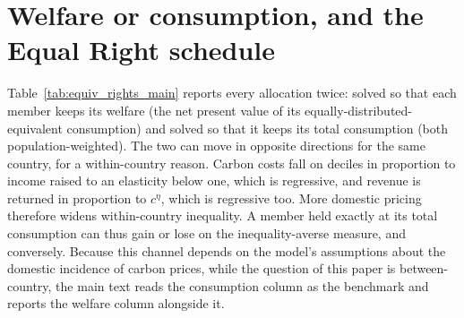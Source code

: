 \documentclass[12pt,english]{article}
\theoremstyle{remark}
\begin{document}



\section{Welfare or consumption, and the Equal Right schedule}
\label{app:ede}

Table~\ref{tab:equiv_rights_main} reports every allocation twice: solved so that each member keeps its welfare (the net present value of its equally-distributed-equivalent consumption) and solved so that it keeps its total consumption (both population-weighted). The two can move in opposite directions for the same country, for a within-country reason. Carbon costs fall on deciles in proportion to income raised to an elasticity below one, which is regressive, and revenue is returned in proportion to $c^{\eta}$, which is regressive too. More domestic pricing therefore widens within-country inequality. A member held exactly at its total consumption can thus gain or lose on the inequality-averse measure, and conversely. Because this channel depends on the model's assumptions about the domestic incidence of carbon prices, while the question of this paper is between-country, the main text reads the consumption column as the benchmark and reports the welfare column alongside it.
\end{document}
